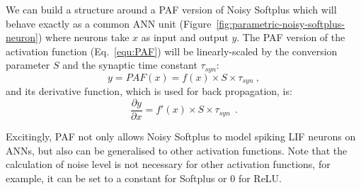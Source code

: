 \documentclass{article}
\begin{document}
We can build a structure around a PAF version of Noisy Softplus which will behave exactly as a common ANN unit (Figure~\ref{fig:parametric-noisy-softplus-neuron}) where neurons take $x$ as input and output $y$.
The PAF version of the activation function (Eq.~\ref{equ:PAF}) will be linearly-scaled by the conversion parameter $S$ and the synaptic time constant $\tau_{syn}$:
\begin{equation}
y = PAF(x) = f(x) \times S \times \tau_{syn}~,
\label{equ:PAF}
\end{equation}
and its derivative function, which is used for back propagation, is:
\begin{equation}
\frac{\partial y}{\partial x} = f'(x) \times S \times \tau_{syn}~~.
\end{equation}

Excitingly, PAF not only allows Noisy Softplus to model spiking LIF neurons on ANNs, but also can be generalised to other activation functions.
Note that the calculation of noise level is not necessary for other activation functions, for example, it can be set to a constant for Softplus or 0 for ReLU.
%
%
%
%
\end{document}
